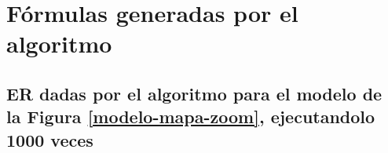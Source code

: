 \chapter{F\'ormulas generadas por el algoritmo}

\section{ER dadas por el algoritmo para el modelo de la Figura \ref{modelo-mapa-zoom}, ejecutandolo 1000 veces}
\label{er-mapa-zoom}












